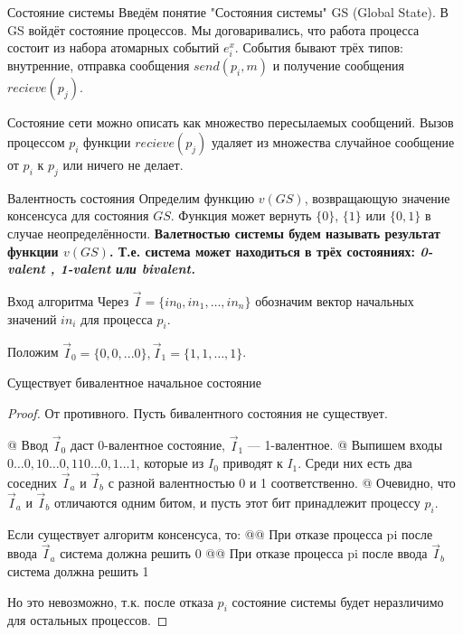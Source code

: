 Состояние системы
Введём понятие "Состояния системы" GS (Global State). В GS войдёт состояние процессов. 
Мы договаривались, что работа процесса состоит из набора атомарных событий $e_i^x$.
События бывают трёх типов: внутренние, отправка сообщения
$send(p_i, m)$ и получение сообщения $recieve(p_j)$.

Состояние сети можно описать как множество пересылаемых
сообщений. Вызов процессом $p_i$ функции $recieve(p_j)$ удаляет из
множества случайное сообщение от $p_i$ к $p_j$ или ничего не делает.

Валентность состояния
Определим функцию $v(GS)$, возвращающую значение консенсуса
для состояния $GS$. Функция может вернуть $\{0\}$, $\{1\}$ или $\{0, 1\}$ в случае неопределённости.
\bf{Валетностью системы} будем называть результат функции $v(GS)$.
Т.е. система может находиться в трёх состояниях: \it{0-valent} , \it{1-valent} или \it{bivalent}.

Вход алгоритма
Через $\vec{I} = \{in_0, in_1, \dots, in_n\}$ обозначим вектор начальных значений $in_i$ для процесса $p_i$.

Положим $\vec{I}_0 = \{0, 0, . . . 0\}, \vec{I}_1 = \{1, 1, \dots, 1\}$.

\begin{thm}
Существует бивалентное начальное состояние
\end{thm}
\begin{proof}
От противного. Пусть бивалентного состояния не существует.

\begin{el}[ul]
@ Ввод $\vec{I}_0$ даст 0-валентное состояние, $\vec{I}_1$ --- 1-валентное.
@ Выпишем входы $0\dots0, 10\dots0, 110\dots0, 1\dots1$, которые из $I_0$  приводят к $I_1$. Среди них есть два соседних $\vec{I}_a$ и $\vec{I}_b$ с разной валентностью 0 и 1 соответственно.
@ Очевидно, что $\vec{I}_a$ и $\vec{I}_b$ отличаются одним битом, и пусть этот бит принадлежит процессу $p_i$.

Если существует алгоритм консенсуса, то:
@@ При отказе процесса pi после ввода $\vec{I}_a$ система должна решить 0
@@ При отказе процесса pi после ввода $\vec{I}_b$ система должна решить 1
\end{el}

Но это невозможно, т.к. после отказа $p_i$ состояние системы будет
неразличимо для остальных процессов.
\end{proof}

